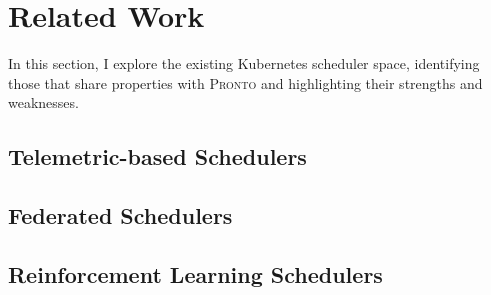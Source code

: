 %
%
%


\section{Related Work}
In this section, I explore the existing Kubernetes scheduler space, identifying
those that share properties with \textsc{Pronto} and highlighting their strengths and
weaknesses.

\subsection{Telemetric-based Schedulers}

\subsection{Federated Schedulers}

\subsection{Reinforcement Learning Schedulers}

